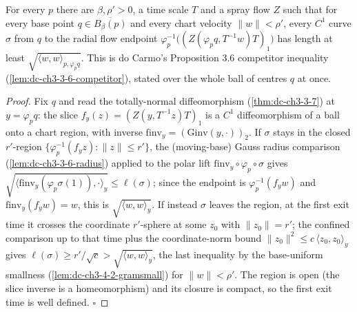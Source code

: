 \begin{lemma}
  \label{lem:dc-ch3-4-2-competitor-lb}
  \leanok
  For every $p$ there are $\beta,\rho'>0$, a time scale $T$ and a spray flow $Z$ such that for every
  base point $q\in\overline{B_\beta(p)}$ and every chart velocity $\|w\|<\rho'$, every $C^1$ curve
  $\sigma$ from $q$ to the radial flow endpoint $\varphi_p^{-1}\big((Z(\varphi_p q,T^{-1}w)T)_1\big)$
  has length at least $\sqrt{\langle w,w\rangle_{p,\varphi_p q}}$. This is do Carmo's Proposition 3.6
  competitor inequality (\cref{lem:dc-ch3-3-6-competitor}), stated over the whole ball of centres $q$
  at once.
\end{lemma}
\begin{proof}
  \leanok
  Fix $q$ and read the totally-normal diffeomorphism (\cref{thm:dc-ch3-3-7}) at $y=\varphi_p q$: the
  slice $f_y(z)=(Z(y,T^{-1}z)T)_1$ is a $C^1$ diffeomorphism of a ball onto a chart region, with
  inverse $\mathrm{finv}_y=(\mathrm{Ginv}(y,\cdot))_2$. If $\sigma$ stays in the closed $r'$-region
  $\{\varphi_p^{-1}(f_y z):\|z\|\le r'\}$, the (moving-base) Gauss radius comparison
  (\cref{lem:dc-ch3-3-6-radius}) applied to the polar lift $\mathrm{finv}_y\circ\varphi_p\circ\sigma$
  gives $\sqrt{\langle\mathrm{finv}_y(\varphi_p\sigma(1)),\cdot\rangle_y}\le\ell(\sigma)$; since the
  endpoint is $\varphi_p^{-1}(f_y w)$ and $\mathrm{finv}_y(f_y w)=w$, this is
  $\sqrt{\langle w,w\rangle_y}$. If instead $\sigma$ leaves the region, at the first exit time it
  crosses the coordinate $r'$-sphere at some $z_0$ with $\|z_0\|=r'$; the confined comparison up to
  that time plus the coordinate-norm bound $\|z_0\|^2\le c\,\langle z_0,z_0\rangle_y$ gives
  $\ell(\sigma)\ge r'/\sqrt c>\sqrt{\langle w,w\rangle_y}$, the last inequality by the base-uniform
  smallness (\cref{lem:dc-ch3-4-2-gramsmall}) for $\|w\|<\rho'$. The region is open (the slice inverse
  is a homeomorphism) and its closure is compact, so the first exit time is well defined. $\square$
\end{proof}

